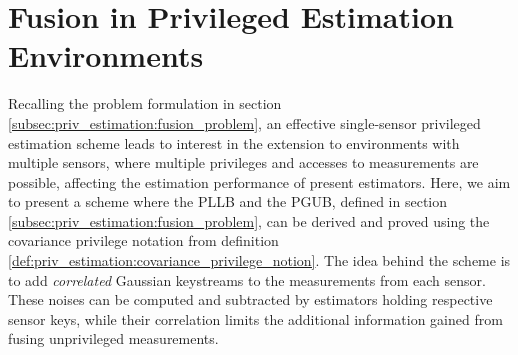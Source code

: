 % 
%                                                                                             
%                                                                                             
%                                                                                             
% 

\section{Fusion in Privileged Estimation Environments}\label{sec:priv_estimation:privileged_fusion}
Recalling the problem formulation in section \ref{subsec:priv_estimation:fusion_problem}, an effective single-sensor privileged estimation scheme leads to interest in the extension to environments with multiple sensors, where multiple privileges and accesses to measurements are possible, affecting the estimation performance of present estimators. Here, we aim to present a scheme where the PLLB and the PGUB, defined in section \ref{subsec:priv_estimation:fusion_problem}, can be derived and proved using the covariance privilege notation from definition \ref{def:priv_estimation:covariance_privilege_notion}. The idea behind the scheme is to add \textit{correlated} Gaussian keystreams to the measurements from each sensor. These noises can be computed and subtracted by estimators holding respective sensor keys, while their correlation limits the additional information gained from fusing unprivileged measurements.

% 
% 

